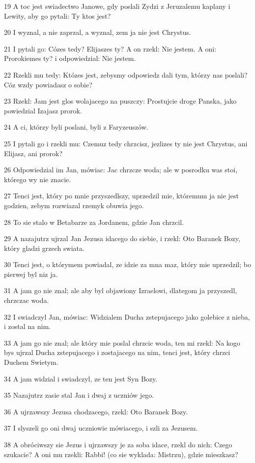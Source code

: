 \par 19 A toc jest swiadectwo Janowe, gdy poslali Zydzi z Jeruzalemu kaplany i Lewity, aby go pytali: Ty ktos jest?
\par 20 I wyznal, a nie zaprzal, a wyznal, zem ja nie jest Chrystus.
\par 21 I pytali go: Cózes tedy? Elijaszes ty? A on rzekl: Nie jestem. A oni: Prorokiemes ty? i odpowiedzial: Nie jestem.
\par 22 Rzekli mu tedy: Któzes jest, zebysmy odpowiedz dali tym, którzy nas poslali? Cóz wzdy powiadasz o sobie?
\par 23 Rzekl: Jam jest glos wolajacego na puszczy: Prostujcie droge Panska, jako powiedzial Izajasz prorok.
\par 24 A ci, którzy byli poslani, byli z Faryzeuszów.
\par 25 I pytali go i rzekli mu: Czemuz tedy chrzcisz, jezlizes ty nie jest Chrystus, ani Elijasz, ani prorok?
\par 26 Odpowiedzial im Jan, mówiac: Jac chrzcze woda; ale w posrodku was stoi, którego wy nie znacie.
\par 27 Tenci jest, który po mnie przyszedlszy, uprzedzil mie, któremum ja nie jest godzien, zebym rozwiazal rzemyk obuwia jego.
\par 28 To sie stalo w Betabarze za Jordanem, gdzie Jan chrzcil.
\par 29 A nazajutrz ujrzal Jan Jezusa idacego do siebie, i rzekl: Oto Baranek Bozy, który gladzi grzech swiata.
\par 30 Tenci jest, o którymem powiadal, ze idzie za mna maz, który mie uprzedzil; bo pierwej byl niz ja.
\par 31 A jam go nie znal; ale aby byl objawiony Izraelowi, dlategom ja przyszedl, chrzczac woda.
\par 32 I swiadczyl Jan, mówiac: Widzialem Ducha zstepujacego jako golebice z nieba, i zostal na nim.
\par 33 A jam go nie znal; ale który mie poslal chrzcic woda, ten mi rzekl: Na kogo bys ujrzal Ducha zstepujacego i zostajacego na nim, tenci jest, który chrzci Duchem Swietym.
\par 34 A jam widzial i swiadczyl, ze ten jest Syn Bozy.
\par 35 Nazajutrz zasie stal Jan i dwaj z uczniów jego.
\par 36 A ujrzawszy Jezusa chodzacego, rzekl: Oto Baranek Bozy.
\par 37 I slyszeli go oni dwaj uczniowie mówiacego, i szli za Jezusem.
\par 38 A obróciwszy sie Jezus i ujrzawszy je za soba idace, rzekl do nich: Czego szukacie? A oni mu rzekli: Rabbi! (co sie wyklada: Mistrzu), gdzie mieszkasz?
